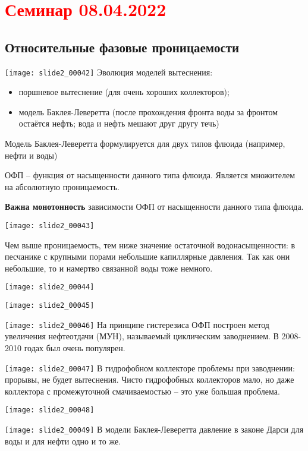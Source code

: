 \documentclass[main.tex]{subfiles}
\begin{document}
\section{\textcolor{red}{Семинар 08.04.2022}}
\subsection{Относительные фазовые проницаемости}
\texttt{[image: slide2\_00042]}
Эволюция моделей вытеснения:
\begin{itemize}
	\item поршневое вытеснение (для очень хороших коллекторов);
	\item модель Баклея-Леверетта (после прохождения фронта воды за фронтом остаётся нефть; вода и нефть мешают друг другу течь)
\end{itemize}

Модель Баклея-Леверетта формулируется для двух типов флюида (например, нефти и воды)

ОФП -- функция от насыщенности данного типа флюида. Является множителем на абсолютную проницаемость.

\textbf{Важна монотонность} зависимости ОФП от насыщенности данного типа флюида.

\texttt{[image: slide2\_00043]}

Чем выше проницаемость, тем ниже значение остаточной водонасыщенности: в песчанике с крупными порами небольшие капиллярные давления. Так как они небольшие, то и намертво связанной воды тоже немного.



\texttt{[image: slide2\_00044]}

\texttt{[image: slide2\_00045]}

\texttt{[image: slide2\_00046]}
На принципе гистерезиса ОФП построен метод увеличения нефтеотдачи (МУН), называемый циклическим заводнением. В 2008-2010 годах был очень популярен.

\texttt{[image: slide2\_00047]}
В гидрофобном коллекторе проблемы при заводнении: прорывы, не будет вытеснения. Чисто гидрофобных коллекторов мало, но даже коллектора с промежуточной смачиваемостью -- это уже большая проблема.

\texttt{[image: slide2\_00048]}

\texttt{[image: slide2\_00049]}
В модели Баклея-Леверетта давление в законе Дарси для воды и для нефти одно и то же.
\end{document}
